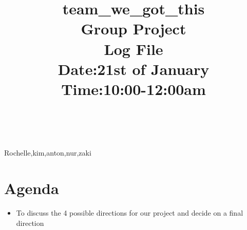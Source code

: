 \documentclass{article}
\begin{document}
	\title{team\_we\_got\_this\\ Group Project \\ Log File\\Date:21st of January\\Time:10:00-12:00am}
	
	\maketitle
	


 \\\\
		Rochelle,kim,anton,nur,zaki

	\section*{Agenda}
		\begin{itemize}
			\item To discuss the 4 possible directions for our project and decide on a final direction
		\end{itemize}
	
\end{document}
